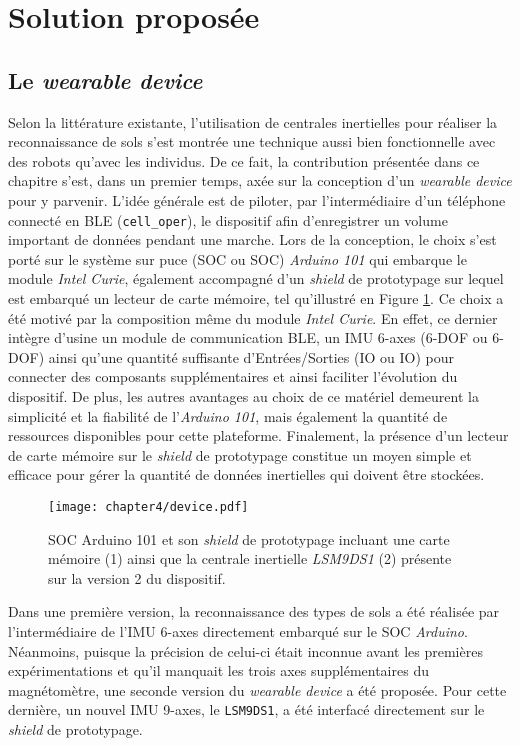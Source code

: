 \section{Solution proposée}

\subsection{Le \textit{wearable device}}

Selon la littérature existante, l'utilisation de centrales inertielles pour réaliser la reconnaissance de sols s'est montrée une technique aussi bien fonctionnelle avec des robots qu'avec les individus. De ce fait, la contribution présentée dans ce chapitre s'est, dans un premier temps, axée sur la conception d'un \textit{wearable device} pour y parvenir. L'idée générale est de piloter, par l'intermédiaire d'un téléphone connecté en \acs{BLE} (\texttt{cell\_oper}), le dispositif afin d'enregistrer un volume important de données pendant une marche. Lors de la conception, le choix s'est porté sur le système sur puce (\acl{SOC} ou \acs{SOC}) \textit{Arduino 101} qui embarque le module \textit{Intel Curie}, également accompagné d'un \textit{shield} de prototypage sur lequel est embarqué un lecteur de carte mémoire, tel qu'illustré en Figure \ref{fig:device}. Ce choix a été motivé par la composition même du module \textit{Intel Curie}. En effet, ce dernier intègre d'usine un module de communication \acs{BLE}, un \acs{IMU} 6-axes (6-\acl{DOF} ou 6-\acs{DOF}) ainsi qu'une quantité suffisante d'Entrées/Sorties (\acl{IO} ou \acs{IO}) pour connecter des composants supplémentaires et ainsi faciliter l'évolution du dispositif. De plus, les autres avantages au choix de ce matériel demeurent la simplicité et la fiabilité de l'\textit{Arduino 101}, mais également la quantité de ressources disponibles pour cette plateforme. Finalement, la présence d'un lecteur de carte mémoire sur le \textit{shield} de prototypage constitue un moyen simple et efficace pour gérer la quantité de données inertielles qui doivent être stockées.

\begin{figure}[b!]
	\centering
	\texttt{[image: chapter4/device.pdf]}
        \caption{\acs{SOC} Arduino 101 et son \textit{shield} de prototypage incluant une carte mémoire (1) ainsi que la centrale inertielle \textit{LSM9DS1} (2) présente sur la version 2 du dispositif.}
	\label{fig:device}
\end{figure}

Dans une première version, la reconnaissance des types de sols a été réalisée par l'intermédiaire de l'IMU 6-axes directement embarqué sur le \acs{SOC} \textit{Arduino}. Néanmoins, puisque la précision de celui-ci était inconnue avant les premières expérimentations et qu'il manquait les trois axes supplémentaires du magnétomètre, une seconde version du \textit{wearable device} a été proposée. Pour cette dernière, un nouvel IMU 9-axes, le \texttt{LSM9DS1}, a été interfacé directement sur le \textit{shield} de prototypage.

